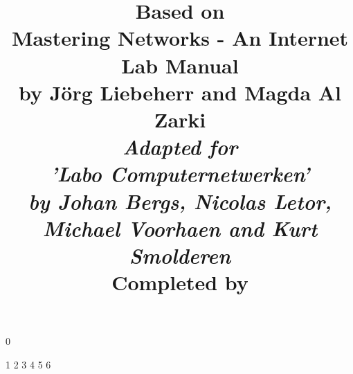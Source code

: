 

\title{
\textbf{Based on \\ Mastering Networks - An Internet Lab Manual\\
by J\"{o}rg Liebeherr and Magda Al Zarki}\\
\vspace{10mm}
\large{\emph{Adapted for \\ 'Labo Computernetwerken' \\
by Johan Bergs, Nicolas Letor, Michael Voorhaen and Kurt Smolderen}} \\
\vspace{10mm}
\large{Completed by}
\vspace{-10mm}
}

\usepackage{url}




\frontmatter
\maketitle

\mainmatter
%
\setcounter {chapter} {0}

\setcounter {chapter} {1}
%
\setcounter {chapter} {2}
%
\setcounter {chapter} {3}
%
\setcounter {chapter} {4}
%
\setcounter {chapter} {5}
%
\setcounter {chapter} {6}
%
\backmatter


 
